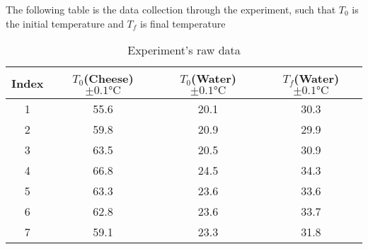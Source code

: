 The following table is the data collection through the experiment, such that $T_0$ is the initial temperature and $T_f$ is final temperature
\begin{table} [h]
	\centering
\begin{tabular} {c|c|c|c} \label{tb:RawData}
	Index & $T_0$(Cheese) $\pm 0.1 \si{\celsius}$& $T_0$(Water) $\pm 0.1 \si{\celsius}$& $T_f$(Water) $ \pm 0.1 \si{\celsius}$\\ \hline
	1 & 55.6 &	20.1 &	30.3 \\
	2 & 59.8 &	20.9 &	29.9 \\
	3 & 63.5 &	20.5 &	30.9 \\
	4 & 66.8 &	24.5 &	34.3 \\
	5 & 63.3 &	23.6 &	33.6 \\
	6 & 62.8 &	23.6 &	33.7 \\
	7 & 59.1 &	23.3 &	31.8 \\
\end{tabular}
\caption{Experiment's raw data}
\end{table}
